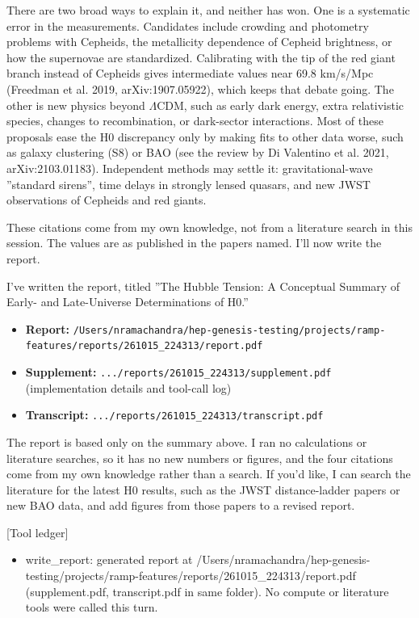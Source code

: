\documentclass[11pt,a4paper]{article}
\begin{document}
There are two broad ways to explain it, and neither has won. One is a systematic error in the measurements. Candidates include crowding and photometry problems with Cepheids, the metallicity dependence of Cepheid brightness, or how the supernovae are standardized. Calibrating with the tip of the red giant branch instead of Cepheids gives intermediate values near 69.8 km/s/Mpc (Freedman et al. 2019, arXiv:1907.05922), which keeps that debate going. The other is new physics beyond $\Lambda$CDM, such as early dark energy, extra relativistic species, changes to recombination, or dark-sector interactions. Most of these proposals ease the H0 discrepancy only by making fits to other data worse, such as galaxy clustering (S8) or BAO (see the review by Di Valentino et al. 2021, arXiv:2103.01183). Independent methods may settle it: gravitational-wave ''standard sirens'', time delays in strongly lensed quasars, and new JWST observations of Cepheids and red giants.

These citations come from my own knowledge, not from a literature search in this session. The values are as published in the papers named. I'll now write the report.

I've written the report, titled ''The Hubble Tension: A Conceptual Summary of Early- and Late-Universe Determinations of H0.''

\begin{itemize}
  \item \textbf{Report:} \texttt{/\allowbreak{}Users/\allowbreak{}nramachandra/\allowbreak{}hep-genesis-testing/\allowbreak{}projects/\allowbreak{}ramp-features/\allowbreak{}reports/\allowbreak{}261015\_\allowbreak{}224313/\allowbreak{}report.pdf}
  \item \textbf{Supplement:} \texttt{.../\allowbreak{}reports/\allowbreak{}261015\_\allowbreak{}224313/\allowbreak{}supplement.pdf} (implementation details and tool-call log)
  \item \textbf{Transcript:} \texttt{.../\allowbreak{}reports/\allowbreak{}261015\_\allowbreak{}224313/\allowbreak{}transcript.pdf}
\end{itemize}
The report is based only on the summary above. I ran no calculations or literature searches, so it has no new numbers or figures, and the four citations come from my own knowledge rather than a search. If you'd like, I can search the literature for the latest H0 results, such as the JWST distance-ladder papers or new BAO data, and add figures from those papers to a revised report.

[Tool ledger]

\begin{itemize}
  \item write\_report: generated report at /Users/nramachandra/hep-genesis-testing/projects/ramp-features/reports/261015\_224313/report.pdf (supplement.pdf, transcript.pdf in same folder). No compute or literature tools were called this turn.
\end{itemize}
\end{document}
